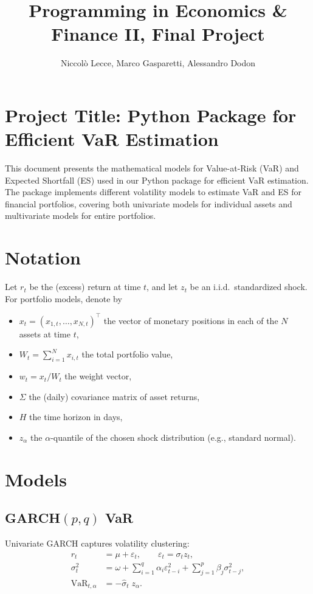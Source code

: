 \documentclass[12pt]{article}
\title{\textbf{\huge Programming in Economics \& Finance II, Final Project}}
\author{Niccol\`o Lecce, Marco Gasparetti, Alessandro Dodon}
\date{}
\begin{document}
\maketitle

\section*{Project Title: Python Package for Efficient VaR Estimation}

This document presents the mathematical models for Value-at-Risk (VaR) and Expected Shortfall (ES) used in our Python package for efficient VaR estimation. The package implements different volatility models to estimate VaR and ES for financial portfolios, covering both univariate models for individual assets and multivariate models for entire portfolios.

\section*{Notation}
Let $r_t$ be the (excess) return at time $t$, and let $z_t$ be an i.i.d.\ standardized shock.  For portfolio models, denote by
\begin{itemize}
  \item $x_t = (x_{1,t},\dots,x_{N,t})^\top$ the vector of monetary positions in each of the $N$ assets at time $t$,  
  \item $W_t = \sum_{i=1}^N x_{i,t}$ the total portfolio value,  
  \item $w_t = x_t / W_t$ the weight vector,  
  \item $\Sigma$ the (daily) covariance matrix of asset returns,  
  \item $H$ the time horizon in days,  
  \item $z_\alpha$ the $\alpha$-quantile of the chosen shock distribution (e.g., standard normal).  
\end{itemize}

\section*{Models}

\subsection*{GARCH$(p,q)$ VaR}
Univariate GARCH captures volatility clustering:
\begin{align*}
  r_t &= \mu + \varepsilon_t, \qquad \varepsilon_t = \sigma_t z_t,  \\  
  \sigma_t^2 &= \omega + \sum_{i=1}^q \alpha_i \varepsilon_{t-i}^2 + \sum_{j=1}^p \beta_j \sigma_{t-j}^2,  \\   
  \text{VaR}_{t,\alpha} &= -\hat{\sigma}_t \; z_\alpha.
\end{align*}
\end{document}
